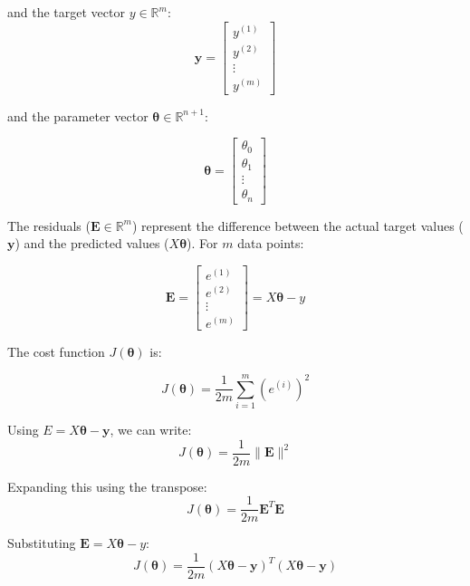 and the target vector $y \in \mathbb{R}^m$:
\begin{equation}
\mathbf{y} =
\begin{bmatrix}
y^{(1)} \\
y^{(2)} \\
\vdots \\
y^{(m)}
\end{bmatrix}
\end{equation}

and the parameter vector $\boldsymbol{\theta} \in \mathbb{R}^{n+1}$:

\begin{equation}
    \boldsymbol{\theta} =
     \begin{bmatrix}
     \theta_0 \\
     \theta_1 \\
     \vdots \\
     \theta_n
     \end{bmatrix}
\end{equation}


The residuals (\(\mathbf{E} \in \mathbb{R}^m\)) represent the difference between the actual target values (\(\mathbf{y}\)) and the
predicted values (\(X \boldsymbol{\theta}\)). For \(m\) data points:

\begin{equation}
    \mathbf{E} = \begin{bmatrix}
    e^{(1)} \\
    e^{(2)} \\
    \vdots \\
    e^{(m)}
    \end{bmatrix}
    = X \boldsymbol{\theta} - y
\end{equation}

The cost function \(J(\boldsymbol{\theta})\) is:

\begin{equation}
    J(\boldsymbol{\theta}) = \frac{1}{2m} \sum_{i=1}^m \left( e^{(i)} \right)^2
\end{equation}

Using \(E = X \boldsymbol{\theta} - \mathbf{y}\), we can write:
\[
J(\boldsymbol{\theta}) = \frac{1}{2m} \|\mathbf{E}\|^2
\]

Expanding this using the transpose:
\[
J(\boldsymbol{\theta}) = \frac{1}{2m} \mathbf{E}^T \mathbf{E}
\]

Substituting \(\mathbf{E} = X \boldsymbol{\theta} - y\):
\begin{equation}
J(\boldsymbol{\theta}) = \frac{1}{2m} (X \boldsymbol{\theta} - \mathbf{y})^T (X \boldsymbol{\theta} - \mathbf{y})
\end{equation}


